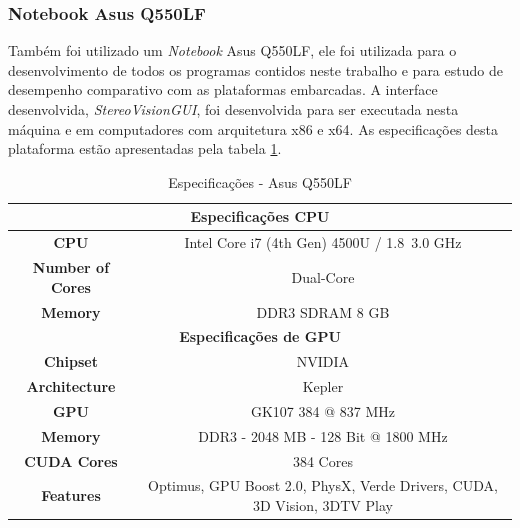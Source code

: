 \subsubsection{Notebook Asus Q550LF}

Também foi utilizado um \textit{Notebook} Asus Q550LF, ele foi utilizada para o desenvolvimento de todos os programas contidos neste trabalho e para estudo de desempenho comparativo com as plataformas embarcadas. A interface desenvolvida, \textit{StereoVisionGUI}, foi desenvolvida para ser executada nesta máquina e em computadores com arquitetura x86 e x64. As especificações desta plataforma estão apresentadas pela tabela \ref{asusQ550LF}.

\begin{table}[]
\centering
\caption{Especificações - Asus Q550LF}
\label{asusQ550LF}
\begin{tabular}{|c|c|}
\hline
\multicolumn{2}{|c|}{\textbf{Especificações CPU}}                                                   \\ \hline
\textbf{CPU}             & Intel Core i7 (4th Gen) 4500U / 1.8~3.0 GHz                              \\ \hline
\textbf{Number of Cores} & Dual-Core                                                                \\ \hline
\textbf{Memory}          & DDR3 SDRAM 8 GB                                                          \\ \hline
\multicolumn{2}{|c|}{\textbf{Especificações de GPU}}                                                  \\ \hline
\textbf{Chipset}         & NVIDIA                                                                   \\ \hline
\textbf{Architecture}    & Kepler                                                                   \\ \hline
\textbf{GPU}             & GK107 384 @ 837 MHz                                                      \\ \hline
\textbf{Memory}          & DDR3 - 2048 MB - 128 Bit @ 1800 MHz                                      \\ \hline
\textbf{CUDA Cores}      & 384 Cores                                                                \\ \hline
\textbf{Features}        & Optimus, GPU Boost 2.0, PhysX, Verde Drivers, CUDA, 3D Vision, 3DTV Play \\ \hline
\end{tabular}
\end{table}


